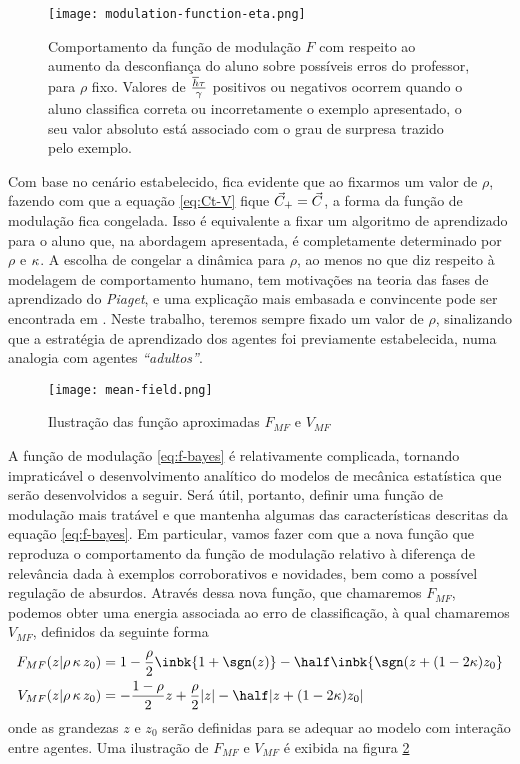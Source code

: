 \begin{figure*}[h!]\label{fig:Fns}
  \centering \texttt{[image: modulation-function-eta.png]}
  \caption{Comportamento da função de modulação $F$ com respeito ao aumento da
    desconfiança do aluno sobre possíveis erros do professor, para $\rho$
    fixo. Valores de $\frac{\overline{h}\tau}{\gamma}$ positivos ou negativos ocorrem
    quando o aluno classifica correta ou incorretamente o exemplo apresentado, o
    seu valor absoluto está associado com o grau de surpresa trazido pelo
    exemplo.}
\end{figure*}

Com base no cenário estabelecido, fica evidente que ao fixarmos um valor de
$\rho$, fazendo com que a equação \eqref{eq:Ct-V} fique $\vec{C}_+ = \vec{C}$, a forma da
função de modulação fica congelada.  Isso é equivalente a fixar um algoritmo de
aprendizado para o aluno que, na abordagem apresentada, é completamente
determinado por $\rho$ e $\kappa$.  A escolha de congelar a dinâmica para $\rho$,
ao menos no que diz respeito à modelagem de comportamento humano, tem motivações
na teoria das fases de aprendizado do \emph{Piaget}, e uma explicação mais
embasada e convincente pode ser encontrada em \parencite{Cesar2014}.  Neste
trabalho, teremos sempre fixado um valor de $\rho$, sinalizando que a estratégia
de aprendizado dos agentes foi previamente estabelecida, numa analogia com
agentes \emph{``adultos''}.

\newcommand{\EFmf}{\ensuremath{F_{MF}}}
\newcommand{\EVmf}{\ensuremath{V_{MF}}}
\begin{figure}[h!]\label{fig:mf-func}
  \centering
  \texttt{[image: mean-field.png]}
  \caption{Ilustração das função aproximadas $\EFmf$ e $\EVmf$}
\end{figure}
A função de modulação \eqref{eq:f-bayes} é relativamente complicada,
tornando impraticável o desenvolvimento analítico do modelos de
mecânica estatística que serão desenvolvidos a seguir.  Será útil,
portanto, definir uma função de modulação mais tratável e que
mantenha algumas das características descritas da equação
\eqref{eq:f-bayes}.  Em particular, vamos fazer com que a nova função
que reproduza o comportamento da função de modulação relativo à
diferença de relevância dada à exemplos corroborativos e novidades,
bem como a possível regulação de absurdos.  Através dessa nova função,
que chamaremos $\EFmf$, podemos obter uma energia associada ao erro de
classificação, à qual chamaremos $\EVmf$, definidos da seguinte forma
\begin{align}
    \EFmf(z|\rho\,\ns\,z_0) & = 1 - \frac{\rho}{2}\inbk{1+\sgn(z)} -
    \half\inbk{\sgn(z+(1-2\ns)z_0} \label{eq:f-mf} \\
    \EVmf(z|\rho\,\ns\,z_0) & = - \frac{1-\rho}{2}z + \frac{\rho}{2}|z| -
    \half|z+(1-2\ns)z_0| \label{eq:v-mf}
\end{align}
onde as grandezas $z$ e $z_0$ serão definidas para se adequar ao modelo com
interação entre agentes. Uma ilustração de $\EFmf$ e $\EVmf$ é exibida na figura
\ref{fig:mf-func}


